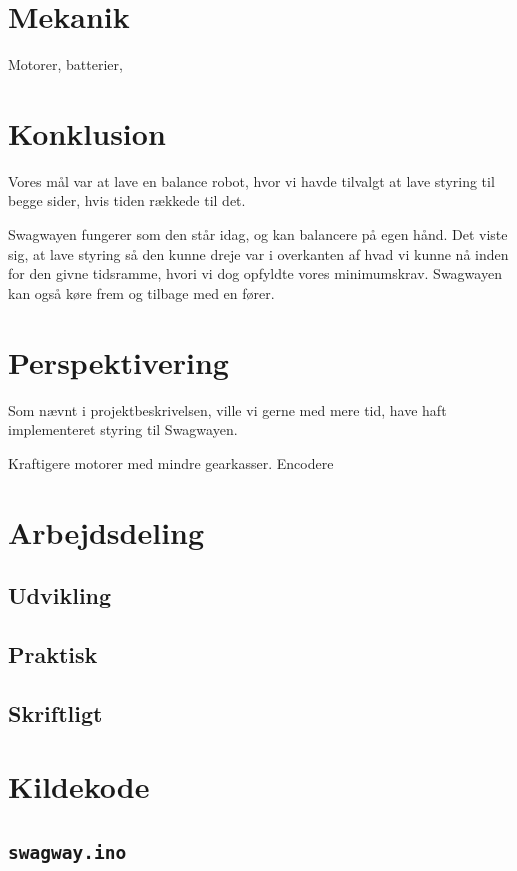 \documentclass[a4paper,oneside,article,danish,table]{memoir}
\begin{document}
\chapter{Mekanik}
Motorer, batterier, 
\chapter{Konklusion} \label{chap:kon}
Vores mål var at lave en balance robot, hvor vi havde tilvalgt at lave styring til begge sider, hvis tiden rækkede til det.

Swagwayen fungerer som den står idag, og kan balancere på egen hånd. Det viste sig, at lave styring så den kunne dreje var i overkanten af hvad vi kunne nå inden for den givne tidsramme, hvori vi dog opfyldte vores minimumskrav. Swagwayen kan også køre frem og tilbage med en fører.

\chapter{Perspektivering} \label{chap:per}
Som nævnt i projektbeskrivelsen, ville vi gerne med mere tid, have haft implementeret styring til Swagwayen. 

Kraftigere motorer med mindre gearkasser.
Encodere


\clearpage
\listoftables
\listoffigures
\nocite{*}
 
\clearpage \appendix

\chapter{Arbejdsdeling}

\section{Udvikling}
\section{Praktisk}
\section{Skriftligt}

\chapter{Kildekode}

\section{\texttt{swagway.ino}}

\end{document}
